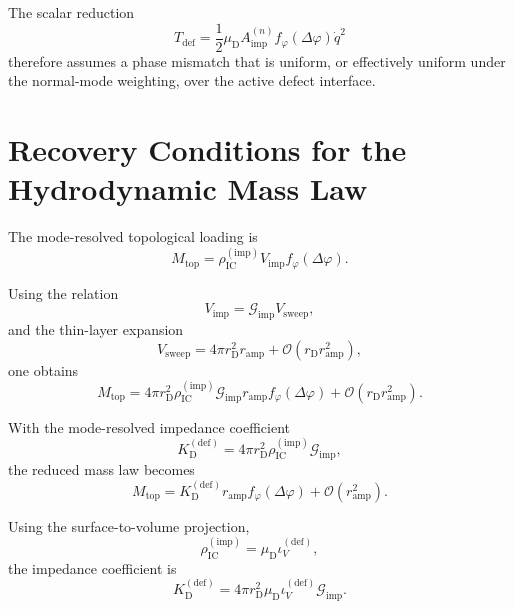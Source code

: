 The scalar reduction
\begin{equation}
    T_{\mathrm{def}} = \frac{1}{2} \mu_{\mathrm{D}} A_{\mathrm{imp}}^{(n)} f_{\varphi}(\Delta\varphi) \dot{q}^2
\end{equation}
therefore assumes a phase mismatch that is uniform, or effectively uniform under the normal-mode weighting, over the active defect interface.

\section{Recovery Conditions for the Hydrodynamic Mass Law}

The mode-resolved topological loading is
\begin{equation}
    M_{\mathrm{top}} = \rho_{\mathrm{IC}}^{(\mathrm{imp})} V_{\mathrm{imp}} f_{\varphi}(\Delta\varphi).
\end{equation}

Using the relation
\begin{equation}
    V_{\mathrm{imp}} = \mathcal{G}_{\mathrm{imp}} V_{\mathrm{sweep}},
\end{equation}
and the thin-layer expansion
\begin{equation}
    V_{\mathrm{sweep}} = 4\pi r_{\mathrm{D}}^2r_{\mathrm{amp}} + \mathcal{O} \left( r_{\mathrm{D}}r_{\mathrm{amp}}^2 \right),
\end{equation}
one obtains
\begin{equation}
    M_{\mathrm{top}} = 4\pi r_{\mathrm{D}}^2 \rho_{\mathrm{IC}}^{(\mathrm{imp})} \mathcal{G}_{\mathrm{imp}} r_{\mathrm{amp}} f_{\varphi}(\Delta\varphi) + \mathcal{O} \left( r_{\mathrm{D}}r_{\mathrm{amp}}^2 \right).
\end{equation}

With the mode-resolved impedance coefficient
\begin{equation}
    K_{\mathrm{D}}^{(\mathrm{def})} = 4\pi r_{\mathrm{D}}^2 \rho_{\mathrm{IC}}^{(\mathrm{imp})} \mathcal{G}_{\mathrm{imp}},
\end{equation}
the reduced mass law becomes
\begin{equation}
    M_{\mathrm{top}} = K_{\mathrm{D}}^{(\mathrm{def})} r_{\mathrm{amp}} f_{\varphi}(\Delta\varphi) + \mathcal{O} \left( r_{\mathrm{amp}}^2 \right).
\end{equation}

Using the surface-to-volume projection,
\begin{equation}
    \rho_{\mathrm{IC}}^{(\mathrm{imp})} = \mu_{\mathrm{D}} \iota_V^{(\mathrm{def})},
\end{equation}
the impedance coefficient is
\begin{equation}
    K_{\mathrm{D}}^{(\mathrm{def})} = 4\pi r_{\mathrm{D}}^2 \mu_{\mathrm{D}} \iota_V^{(\mathrm{def})} \mathcal{G}_{\mathrm{imp}}.
\end{equation}

